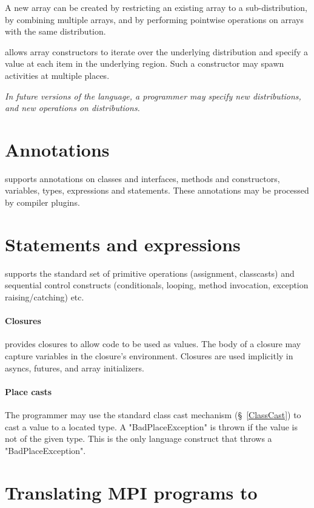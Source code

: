 A new array can be created by restricting an existing array to a
sub-distribution, by combining multiple arrays, and by performing
pointwise operations on arrays with the same distribution.

\Xten{} allows array constructors to iterate over the underlying
distribution and specify a value at each item in the underlying
region. Such a constructor may spawn activities at multiple places.

\emph{In future versions of the language, a programmer may specify new
distributions, and new operations on distributions.}

\section{Annotations}

\Xten{} supports annotations on classes and interfaces, methods
and constructors,
variables, types, expressions and statements.
These annotations may be processed by compiler plugins.

\section{Statements and expressions}

\Xten{} supports the standard set of primitive operations (assignment,
classcasts) and sequential control constructs (conditionals, looping,
method invocation, exception raising/catching) etc.

\paragraph{Closures}
\Xten{} provides closures to allow code to be used
as values.  The body of a closure may capture variables in the closure's
environment.  Closures are used implicitly in asyncs, futures, and array
initializers.

\paragraph{Place casts}
The programmer may use the standard class cast mechanism
(\S~\ref{ClassCast}) to cast a value to a located type. A
\xcd"BadPlaceException" is thrown if the value is not of the given
type. This is the only language construct that throws a \xcd"BadPlaceException".

\section{Translating MPI programs to \Xten{}}

